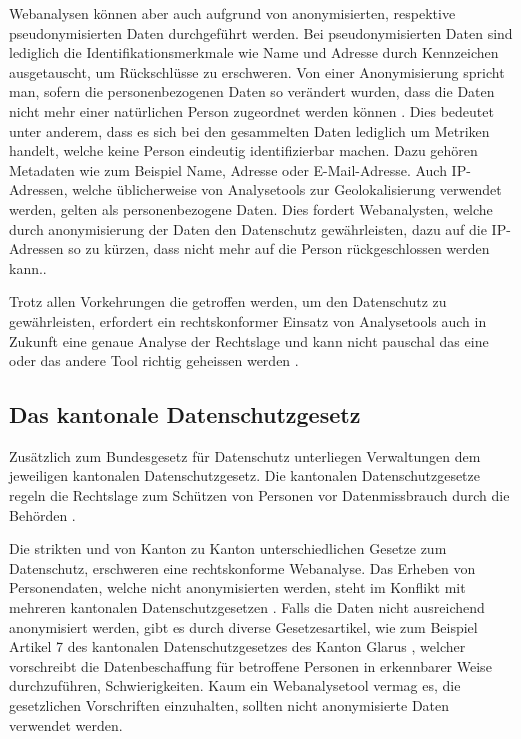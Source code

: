 Webanalysen können aber auch aufgrund von anonymisierten, respektive pseudonymisierten Daten durchgeführt werden. Bei pseudonymisierten Daten sind lediglich die Identifikationsmerkmale wie Name und Adresse durch Kennzeichen ausgetauscht, um Rückschlüsse zu erschweren. Von einer Anonymisierung spricht man, sofern die personenbezogenen Daten so verändert wurden, dass die Daten nicht mehr einer natürlichen Person zugeordnet werden können \parencite[S. 3]{EcommerceUndDatenschutz}. Dies bedeutet unter anderem, dass es sich bei den gesammelten Daten lediglich um Metriken handelt, welche keine Person eindeutig identifizierbar machen. Dazu gehören Metadaten wie zum Beispiel Name, Adresse oder E-Mail-Adresse. Auch IP-Adressen, welche üblicherweise von Analysetools zur Geolokalisierung verwendet werden, gelten als personenbezogene Daten. Dies fordert Webanalysten, welche durch anonymisierung der Daten den Datenschutz gewährleisten, dazu auf die IP-Adressen so zu kürzen, dass nicht mehr auf die Person rückgeschlossen werden kann.\parencite[S. 4]{EcommerceUndDatenschutz}.

Trotz allen Vorkehrungen die getroffen werden, um den Datenschutz zu gewährleisten, erfordert ein rechtskonformer Einsatz von Analysetools auch in Zukunft eine genaue Analyse der Rechtslage und kann nicht pauschal das eine oder das andere Tool richtig geheissen werden \parencite[S. 6]{EcommerceUndDatenschutz}.

\subsection{Das kantonale Datenschutzgesetz}
Zusätzlich zum Bundesgesetz für Datenschutz unterliegen Verwaltungen dem jeweiligen kantonalen Datenschutzgesetz. Die kantonalen Datenschutzgesetze regeln die Rechtslage zum Schützen von Personen vor Datenmissbrauch durch die Behörden \parencite[Vgl. §§ 1 Abs. 1]{DSSGBERN}. 

Die strikten und von Kanton zu Kanton unterschiedlichen Gesetze zum Datenschutz, erschweren eine rechtskonforme Webanalyse. Das Erheben von Personendaten, welche nicht anonymisierten werden, steht im Konflikt mit mehreren kantonalen Datenschutzgesetzen \parencite[Vgl. §§ 15 Abs. 1]{DSSGBERN}. Falls die Daten nicht ausreichend anonymisiert werden, gibt es durch diverse Gesetzesartikel, wie zum Beispiel Artikel 7 des kantonalen Datenschutzgesetzes des Kanton Glarus \parencite[§§ 7 Abs. 1]{DSSGGL}, welcher vorschreibt die Datenbeschaffung für betroffene Personen in erkennbarer Weise durchzuführen, Schwierigkeiten. Kaum ein Webanalysetool vermag es, die gesetzlichen Vorschriften einzuhalten, sollten nicht anonymisierte Daten verwendet werden.

